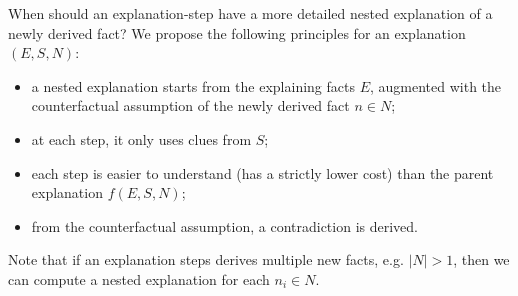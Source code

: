 





When should an explanation-step have a more detailed nested explanation of a newly derived fact? We propose the following principles for an explanation $(E,S,N)$:
\begin{itemize}
 \item a nested explanation starts from the explaining facts $E$, %
 augmented with the counterfactual assumption of the newly derived fact $n \in N$; 
 \item at each step, it only uses clues from $S$;
 \item each step is easier to understand (has a strictly lower cost) than the parent explanation $f(E,S,N)$;
 \item from the counterfactual assumption, a contradiction is derived. %
\end{itemize}

Note that if an explanation steps derives multiple new facts, e.g. $|N| > 1$, then we can compute a nested explanation for each $n_i \in N$.

